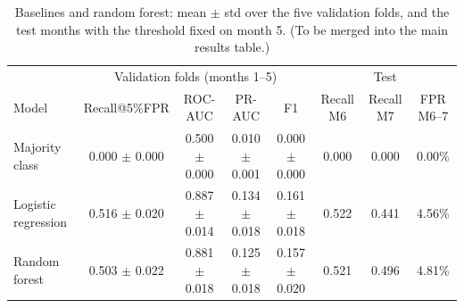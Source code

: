 \begin{table}[!t]
\centering
\caption{Baselines and random forest: mean $\pm$ std over the five validation folds, and the test months with the threshold fixed on month 5. (To be merged into the main results table.)}
\label{tab:member1-results}
\footnotesize
\begin{tabular}{lcccc|ccc}
\hline
 & \multicolumn{4}{c|}{Validation folds (months 1--5)} & \multicolumn{3}{c}{Test} \\
Model & Recall@5\%FPR & ROC-AUC & PR-AUC & F1 & Recall M6 & Recall M7 & FPR M6--7 \\
\hline
Majority class & 0.000 $\pm$ 0.000 & 0.500 $\pm$ 0.000 & 0.010 $\pm$ 0.001 & 0.000 $\pm$ 0.000 & 0.000 & 0.000 & 0.00\% \\
Logistic regression & 0.516 $\pm$ 0.020 & 0.887 $\pm$ 0.014 & 0.134 $\pm$ 0.018 & 0.161 $\pm$ 0.018 & 0.522 & 0.441 & 4.56\% \\
Random forest & 0.503 $\pm$ 0.022 & 0.881 $\pm$ 0.018 & 0.125 $\pm$ 0.018 & 0.157 $\pm$ 0.020 & 0.521 & 0.496 & 4.81\% \\
\hline
\end{tabular}
\end{table}
